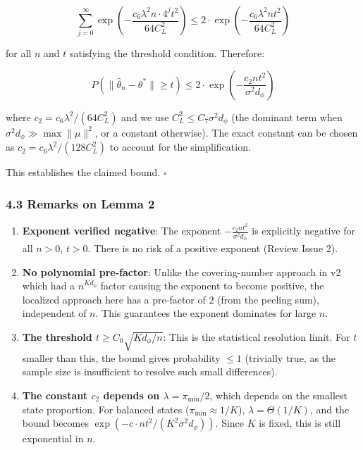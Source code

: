 \documentclass[
  12pt,
]{article}
\begin{document}
\[\sum_{j=0}^\infty \exp\left(-\frac{c_6 \lambda^2 n \cdot 4^j t^2}{64 C_L^2}\right) \leq 2 \cdot \exp\left(-\frac{c_6 \lambda^2 n t^2}{64 C_L^2}\right)\]

for all \(n\) and \(t\) satisfying the threshold condition. Therefore:

\[P(\|\hat{\theta}_n - \theta^*\| \geq t) \leq 2 \cdot \exp\left(-\frac{c_2 n t^2}{\sigma^2 d_\phi}\right)\]

where \(c_2 = c_6 \lambda^2 / (64 C_L^2)\) and we use
\(C_L^2 \leq C_7 \sigma^2 d_\phi\) (the dominant term when
\(\sigma^2 d_\phi \gg \max\|\mu\|^2\), or a constant otherwise). The
exact constant can be chosen as \(c_2 = c_6 \lambda^2 / (128 C_L^2)\) to
account for the simplification.

This establishes the claimed bound. \(\square\)

\subsubsection{4.3 Remarks on Lemma 2}\label{remarks-on-lemma-2}

\begin{enumerate}
\def\labelenumi{\arabic{enumi}.}
\item
  \textbf{Exponent verified negative}: The exponent
  \(-\frac{c_2 n t^2}{\sigma^2 d_\phi}\) is explicitly negative for all
  \(n > 0\), \(t > 0\). There is no risk of a positive exponent (Review
  Issue 2).
\item
  \textbf{No polynomial pre-factor}: Unlike the covering-number approach
  in v2 which had a \(n^{K d_\phi}\) factor causing the exponent to
  become positive, the localized approach here has a pre-factor of \(2\)
  (from the peeling sum), independent of \(n\). This guarantees the
  exponent dominates for large \(n\).
\item
  \textbf{The threshold \(t \geq C_0 \sqrt{K d_\phi / n}\)}: This is the
  statistical resolution limit. For \(t\) smaller than this, the bound
  gives probability \(\leq 1\) (trivially true, as the sample size is
  insufficient to resolve such small differences).
\item
  \textbf{The constant \(c_2\) depends on \(\lambda = \pi_{\min}/2\)},
  which depends on the smallest state proportion. For balanced states
  (\(\pi_{\min} \approx 1/K\)), \(\lambda = \Theta(1/K)\), and the bound
  becomes \(\exp(-c \cdot n t^2 / (K^2 \sigma^2 d_\phi))\). Since \(K\)
  is fixed, this is still exponential in \(n\).
\end{enumerate}
\end{document}
